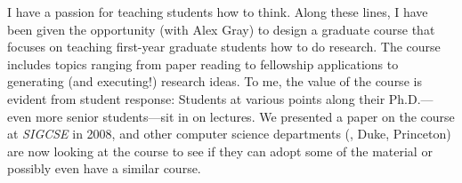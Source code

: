 I have a passion for teaching students how to think.  Along these lines,
I have been given the opportunity (with Alex Gray) to design a graduate
course that focuses on teaching first-year graduate students how to do
research.  The course includes topics ranging from paper reading to
fellowship applications to generating (and executing!)  research
ideas. To me, the value of the course is evident from student response:
Students at various points along their Ph.D.---even more senior
students---sit in on lectures.  We presented a paper on the course at
{\em SIGCSE} in 2008, and other computer science departments (\eg, Duke,
Princeton) are now looking at the course to see if they can adopt some
of the material or possibly even have a similar course.
